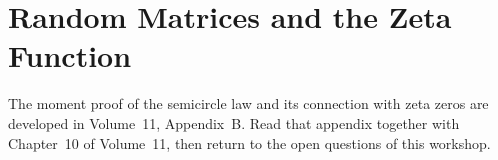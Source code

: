 \chapter{Random Matrices and the Zeta Function}
The moment proof of the semicircle law and its connection with zeta zeros are developed in Volume~11, Appendix~B. Read that appendix together with Chapter~10 of Volume~11, then return to the open questions of this workshop.
